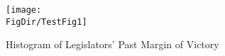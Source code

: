 \hypertarget{TestFig1}{}
\begin{figure}
\centerline{\texttt{[image: \\FigDir/TestFig1]}}
\caption{Histogram of Legislators' Past Margin of Victory}
\label{fig:TestFig1}
\end{figure}
